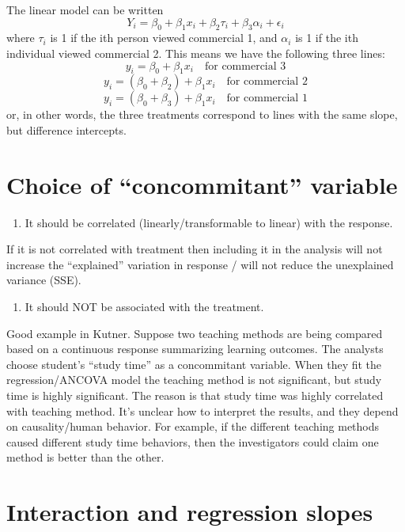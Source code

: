 \documentclass[
]{book}
\providecommand{\tightlist}{%
  \setlength{\itemsep}{0pt}\setlength{\parskip}{0pt}}
\begin{document}
The linear model can be written
\[Y_i =\beta_0 + \beta_1 x_i + \beta_2 \tau_i + \beta_3 \alpha_i + \epsilon_i\]
where \(\tau_i\) is 1 if the ith person viewed commercial 1, and \(\alpha_i\) is 1 if the ith individual viewed commercial 2. This means we have the following three lines:
\[y_i = \beta_0 + \beta_1 x_i\quad \text{for commercial 3}\]
\[y_i = (\beta_0 + \beta_2) + \beta_1 x_i\quad \text{for commercial 2}\]
\[y_i = (\beta_0 + \beta_3) + \beta_1 x_i\quad \text{for commercial 1}\]
or, in other words, the three treatments correspond to lines with the same slope, but difference intercepts.

\hypertarget{choice-of-concommitant-variable}{%
\section{Choice of ``concommitant'' variable}\label{choice-of-concommitant-variable}}

\begin{enumerate}
\def\labelenumi{\arabic{enumi}.}
\tightlist
\item
  It should be correlated (linearly/transformable to linear) with the response.
\end{enumerate}

If it is not correlated with treatment then including it in the analysis will not increase the ``explained'' variation in response / will not reduce the unexplained variance (SSE).

\begin{enumerate}
\def\labelenumi{\arabic{enumi}.}
\setcounter{enumi}{1}
\tightlist
\item
  It should NOT be associated with the treatment.
\end{enumerate}

Good example in Kutner. Suppose two teaching methods are being compared based on a continuous response summarizing learning outcomes. The analysts choose student's ``study time'' as a concommitant variable. When they fit the regression/ANCOVA model the teaching method is not significant, but study time is highly significant. The reason is that study time was highly correlated with teaching method. It's unclear how to interpret the results, and they depend on causality/human behavior. For example, if the different teaching methods caused different study time behaviors, then the investigators could claim one method is better than the other.

\hypertarget{interaction-and-regression-slopes}{%
\section{Interaction and regression slopes}\label{interaction-and-regression-slopes}}
\end{document}
